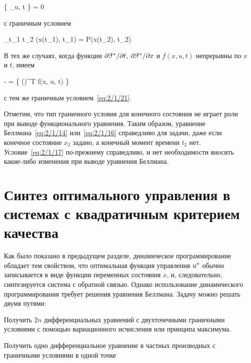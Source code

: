      \Biggl\{ _{u, t} \Biggr\} = 0
\eeq

с граничным условием

    \lim_{t_1 \to t_2} \optF\bigl(x(t_1), t_1\bigr) = P\bigl(x(t_2), t_2\bigr) 
\eeq

В тех же случаях, когда функции $\partial {    \mathcal{F}  ^{*}  } / \partial {t}$, $\partial {    \mathcal{F}  ^{*}  } / \partial {x}$ и $f(x, u, t)$ непрерывны по $x$ и $t$, имеем

    -  =  \Biggl\{ \biggl(\biggr)^T f(x, u, t) \Biggr\}
\eeq

с тем же граничным условием~\ref{eq:2/1/21}.

\br

Отметим, что тип граничного условия для конечного состояния не играет роли при выводе функционального уравнения. Таким образом, уравнение Беллмана~\ref{eq:2/1/14} или~\vref{eq:2/1/16} справедливо для задачи, даже если конечное состояние $x_2$ задано, а конечный момент времени $t_2$ нет. Условие~\vref{eq:2/1/17} по-прежнему справедливо, и нет необходимости вносить какие-либо изменения при выводе уравнения Беллмана.



\section{Синтез оптимального управления в системах с квадратичным критерием качества}



Как было показано в предыдущем разделе, динамическое программирование обладает тем свойством, что оптимальная функция управления $u^{*}$ обычно записывается в виде функции переменных состояния $x$, и, следовательно, синтезируется система с обратной связью. Однако использование динамического программирования требует решения уравнения Беллмана. Задачу можно решать двумя путями:

\benum
    \item
        Получить $2n$ дифференциальных уравнений с двухточечными граничными условиями с помощью вариационного исчисления или принципа максимума.
        
    \item
        Получить одно дифференциальное уравнение в частных производных с граничными условиями в одной точке
\eenum

